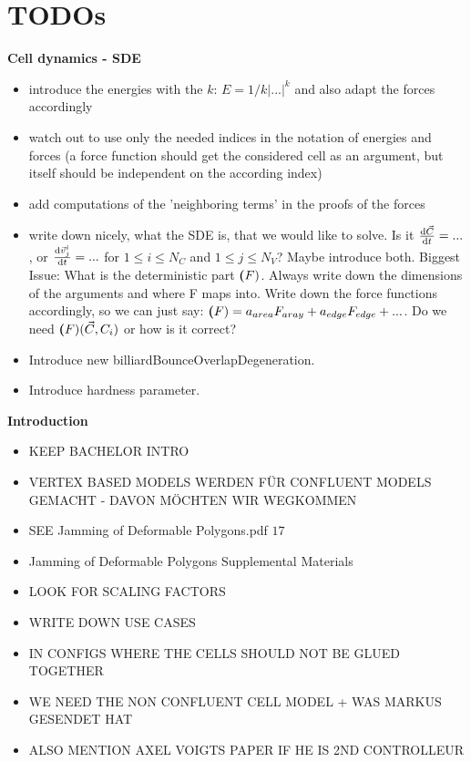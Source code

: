 \section{TODOs}

\textbf{Cell dynamics - SDE}
\begin{itemize}
    \item introduce the energies with the $k$: $E = 1/k |...|^k$ and also adapt the forces accordingly 
    \item watch out to use only the needed indices in the notation of energies and forces (a force function should get the considered cell as an argument, but itself should be independent on the according index)
    \item add computations of the 'neighboring terms' in the proofs of the forces  
    \item write down nicely, what the SDE is, that we would like to solve. Is it $\frac{\mathrm{d} \vec{C}}{\mathrm{d} t} = ... $, or $\frac{\mathrm{d} \vec{v}_j^i}{\mathrm{d} t} = ... $ for $ 1 \leq i \leq N_C$ and $1 \leq j \leq N_V$? Maybe introduce both. Biggest Issue: What is the deterministic part $\textbf(F)$. Always write down the dimensions of the arguments and where F maps into. Write down the force functions accordingly, so we can just say: $\textbf(F) = a_{area} F_{aray} + a_{edge} F_{edge} + ...$. Do we need $\textbf(F)(\vec{C}, C_i)$ or how is it correct?
    \item Introduce new billiardBounceOverlapDegeneration.
    \item Introduce hardness parameter. 
\end{itemize}

\textbf{Introduction}
\begin{itemize}
    \item KEEP BACHELOR INTRO 
    \item VERTEX BASED MODELS WERDEN FÜR CONFLUENT MODELS GEMACHT - DAVON MÖCHTEN WIR WEGKOMMEN 
    \item SEE Jamming of Deformable Polygons.pdf $17$ 
    \item Jamming of Deformable Polygons Supplemental Materials
    \item LOOK FOR SCALING FACTORS
    \item WRITE DOWN USE CASES 
    \item IN CONFIGS WHERE THE CELLS SHOULD NOT BE GLUED TOGETHER
    \item WE NEED THE NON CONFLUENT CELL MODEL + WAS MARKUS GESENDET HAT 
    \item ALSO MENTION AXEL VOIGTS PAPER IF HE IS 2ND CONTROLLEUR 
\end{itemize}

